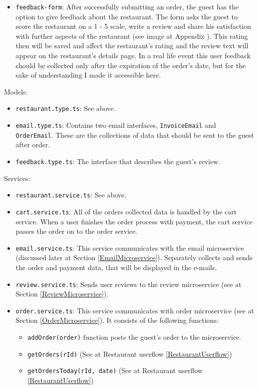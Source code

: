 \begin{itemize}
	\item \verb+feedback-form+: After successfully submitting an order, the guest has the option to give feedback about the restaurant. The form asks the guest to score the restaurant on a 1 - 5 scale, write a review and share his satisfaction with further aspects of the restaurant (see image at Appendix ). This rating then will be saved and affect the restaurant's rating and the review text will appear on the restaurant's details page. In a real life event this user feedback should be collected only after the expiration of the order's date, but for the sake of understanding I made it accessible here.
\end{itemize}
Models:
\begin{itemize}
	\item \verb+restaurant.type.ts+: See above.
	\item \verb+email.type.ts+: Contains two email interfaces, \verb+InvoiceEmail+ and \verb+OrderEmail+. These are the collections of data that should be sent to the guest after order. 
	\item \verb+feedback.type.ts+: The interface that describes the guest's review.
\end{itemize}
Services:
\begin{itemize}
	\item \verb+restaurant.service.ts+: See above.
	\item \verb+cart.service.ts+: All of the orders collected data is handled by the cart service. When a user finishes the order process with payment, the cart service passes the order on to the order service.
	\item \verb+email.service.ts+: This service communicates with the email microservice (discussed later at Section \ref{EmailMicroservice}). Separately collects and sends the order and payment data, that will be displayed in the e-mails.
	\item \verb+review.service.ts+: Sends user reviews to the review microservice (see at Section \ref{ReviewMicroservice}).
	\item \verb+order.service.ts+: This service communicates with order microservice (see at Section \ref{OrderMicroservice}). It consists of the following functions:
	\begin{itemize}
		\item\verb+addOrder(order)+ function posts the guest's order to the microservice.
		\item\verb+getOrders(rId)+ (See at Restaurant userflow \ref{RestaurantUserflow})
		\item\verb+getOrdersToday(rId, date)+ (See at Restaurant userflow  \ref{RestaurantUserflow})
	\end{itemize}
\end{itemize}

